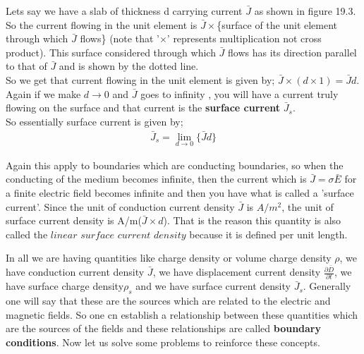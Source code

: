 Lets say we have a slab of thickness d carrying current $\bar{J}$ as shown in figure 19.3. So the current flowing in the unit element is $\bar{J}\times$\{surface of the unit element through which $\bar{J}$ flows\} (note that '$\times$' represents multiplication not cross product).
This surface considered through which $\bar{J}$ flows has its direction parallel to that of $\bar{J}$ and is shown by the dotted line.\\ 
So we get that current flowing in the unit element is given by; $\bar{J}\times(d\times1)=\bar{J}d$. Again if we make $d\rightarrow0$ and $\bar{J}$ goes to infinity , you will have a current truly flowing on the surface and that current is the \textbf{surface current} $\bar{J}_{s}$. \\
So essentially surface current is given by;
\begin{align}
\bar{J}_{s}=\lim_{d\rightarrow0}\{\bar{J}d\}
\end{align}


Again this apply to boundaries which are conducting boundaries, so when the conducting of the medium becomes infinite, then the current which is $\bar{J}=\sigma\bar{E}$ for a finite electric field becomes infinite and then you have what is called a 'surface current'. Since the unit of conduction current density $\bar{J}$ is $A/m^{2}$, the unit of surface current density is A/m($\bar{J}\times d$). That is the reason this quantity is also called the $linear$ $surface$ $current$ $density$ because it is defined per unit length.


In all we are having quantities like charge density or volume charge density $\rho$, we have conduction current density $\bar{J}$, we have displacement current density $\frac{\partial\bar{D}}{\partial t}$, we have surface charge density$\rho_{s}$ and we have surface current density $\bar{J}_{s}$. Generally one will say that these are the sources which are related to the electric and magnetic fields. So one cn establish a relationship between these quantities which are the sources of the fields and these relationships are called \textbf{ boundary conditions}. Now let us solve some problems to reinforce these concepts.

